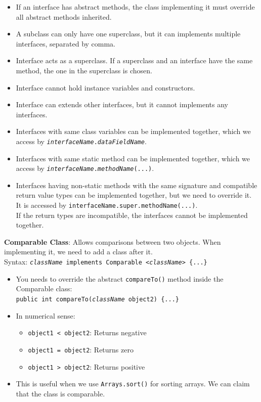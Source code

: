 \documentclass{article}
\begin{document}
\begin{itemize}
	\item If an interface has abstract methods, the class implementing it must override all abstract methods inherited.
	\item A subclass can only have one superclass, but it can implements multiple interfaces, separated by comma.
	\item Interface acts as a superclass. If a superclass and an interface have the same method, the one in the superclass is chosen.
	\item Interface cannot hold instance variables and constructors.
	\item Interface can extends other interfaces, but it cannot implements any interfaces.
	\item Interfaces with same class variables can be implemented together, which we access by \texttt{\textit{interfaceName}.\textit{dataFieldName}}.
	\item Interfaces with same static method can be implemented together, which we access by \texttt{\textit{interfaceName}.\textit{methodName}(...)}.
	\item Interfaces having non-static methods with the same signature and compatible return value types can be implemented together, but we need to override it. It is accessed by \texttt{interfaceName.super.methodName(...)}.\\
	If the return types are incompatible, the interfaces cannot be implemented together.
\end{itemize}

\textbf{Comparable Class}: Allows comparisons between two objects. When implementing it, we need to add a class after it.\\
Syntax: \texttt{\textit{className} implements Comparable <\textit{className}> \{...\}}
\begin{itemize}
	\item You needs to override the abstract \texttt{compareTo()} method inside the Comparable class:\\
	\texttt{public int compareTo(\textit{className} object2) \{...\}}
	\item In numerical sense:
	\begin{itemize}
		\item \texttt{object1 < object2}: Returns negative
		\item \texttt{object1 = object2}: Returns zero
		\item \texttt{object1 > object2}: Returns positive
	\end{itemize}
	\item This is useful when we use \texttt{Arrays.sort()} for sorting arrays. We can claim that the class is comparable.
\end{itemize}
\newpage
\end{document}
